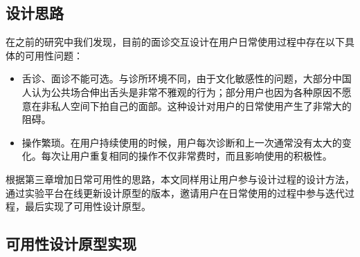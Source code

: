 \subsection{设计思路}
在之前的研究中我们发现，目前的面诊交互设计在用户日常使用过程中存在以下具体的可用性问题：
\begin{itemize}
    \item 舌诊、面诊不能可选。与诊所环境不同，由于文化敏感性的问题，大部分中国人认为公共场合伸出舌头是非常不雅观的行为；部分用户也因为各种原因不愿意在非私人空间下拍自己的面部。这种设计对用户的日常使用产生了非常大的阻碍。
    \item 操作繁琐。在用户持续使用的时候，用户每次诊断和上一次通常没有太大的变化。每次让用户重复相同的操作不仅非常费时，而且影响使用的积极性。
\end{itemize}

根据第三章增加日常可用性的思路，本文同样用让用户参与设计过程的设计方法，通过实验平台在线更新设计原型的版本，邀请用户在日常使用的过程中参与迭代过程，最后实现了可用性设计原型。

\subsection{可用性设计原型实现}

